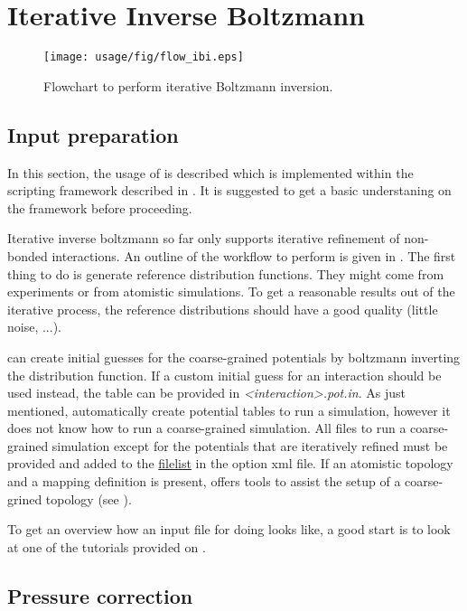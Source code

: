 \section{Iterative Inverse Boltzmann}
\begin{figure}
   \centering
   \texttt{[image: usage/fig/flow\_ibi.eps]}
   \caption{\label{fig:flow_ibi}Flowchart to perform iterative Boltzmann inversion.}
\end{figure}

\subsection{Input preparation}
In this section, the usage of \ibi is described which is implemented within the scripting framework described in . It is suggested to get a basic understaning on the framework before proceeding.

Iterative inverse boltzmann so far only supports iterative refinement of non-bonded interactions. An outline of the workflow to perform \ibi is given in . The first thing to do is generate reference distribution functions. They might come from experiments or from atomistic simulations. To get a reasonable results out of the iterative process, the reference distributions should have a good quality (little noise, ...).

\votca can create initial guesses for the coarse-grained potentials by boltzmann inverting the distribution function. If a custom initial guess for an interaction should be used instead, the table can be provided in \textit{<interaction>.pot.in}. As just mentioned, \votca automatically create potential tables to run a simulation, however it does not know how to run a coarse-grained simulation. All files to run a coarse-grained simulation except for the potentials that are iteratively refined must be provided and added to the \hyperlink{\refopt{cg.inverse.filelist}}{filelist} in the option xml file. If an atomistic topology and a mapping definition is present, \votca offers tools to assist the setup of a  coarse-grined topology (see ).

To get an overview how an input file for doing \ibi looks like, a good start is to look at one of the tutorials provided on \votcaweb.

\subsection{Pressure correction}

